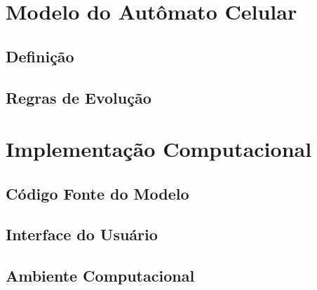 \documentclass[12pt,oneside]{report}
\begin{document}
\section{Modelo do Autômato Celular}

\subsection{Definição}

\subsection{Regras de Evolução}

\section{Implementação Computacional}

\subsection{Código Fonte do Modelo}

\subsection{Interface do Usuário}


\subsection{Ambiente Computacional}
\end{document}

